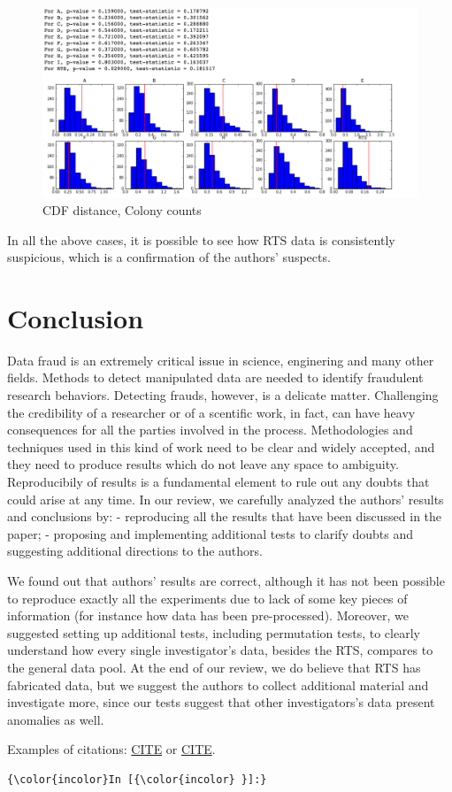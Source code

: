 \documentclass{article}
\begin{document}
\begin{figure}[htbp]
\centering
\includegraphics{images/perm_cdf_colony.png}
\caption{CDF distance, Colony counts}
\end{figure}

In all the above cases, it is possible to see how RTS data is
consistently suspicious, which is a confirmation of the authors'
suspects.

    \section{Conclusion}\label{conclusion}

    Data fraud is an extremely critical issue in science, enginering and
many other fields. Methods to detect manipulated data are needed to
identify fraudulent research behaviors. Detecting frauds, however, is a
delicate matter. Challenging the credibility of a researcher or of a
scentific work, in fact, can have heavy consequences for all the parties
involved in the process. Methodologies and techniques used in this kind
of work need to be clear and widely accepted, and they need to produce
results which do not leave any space to ambiguity. Reproducibily of
results is a fundamental element to rule out any doubts that could arise
at any time. In our review, we carefully analyzed the authors' results
and conclusions by: - reproducing all the results that have been
discussed in the paper; - proposing and implementing additional tests to
clarify doubts and suggesting additional directions to the authors.

We found out that authors' results are correct, although it has not been
possible to reproduce exactly all the experiments due to lack of some
key pieces of information (for instance how data has been
pre-processed). Moreover, we suggested setting up additional tests,
including permutation tests, to clearly understand how every single
investigator's data, besides the RTS, compares to the general data pool.
At the end of our review, we do believe that RTS has fabricated data,
but we suggest the authors to collect additional material and
investigate more, since our tests suggest that other investigators's
data present anomalies as well.

    

    Examples of citations: \protect\hyperlink{cite-PER-GRA:2007}{CITE} or
\protect\hyperlink{cite-Papa2007}{CITE}.

    \begin{Verbatim}[commandchars=\\\{\}]
{\color{incolor}In [{\color{incolor} }]:} 
\end{Verbatim}


    
    
    
    
\end{document}
